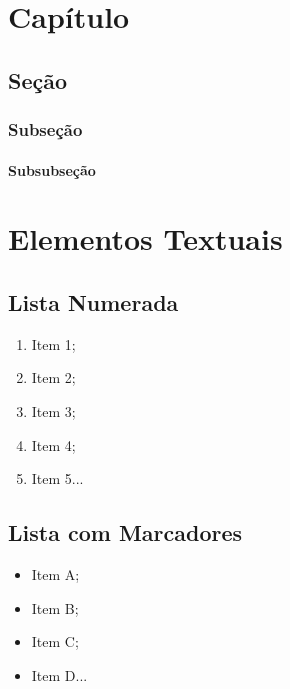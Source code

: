\documentclass[12pt,openright,oneside,a4paper,english,french,spanish,brazil]{unifil}
\begin{document}
\chapter{Capítulo}%


\section{Seção}%


\subsection{Subseção}%


\subsubsection{Subsubseção}%




\chapter{Elementos Textuais}

\section{Lista Numerada}

\begin{enumerate}
 \item Item 1;
 \item Item 2;
 \item Item 3;
 \item Item 4;
 \item Item 5...
\end{enumerate}

\section{Lista com Marcadores}

\begin{itemize}
 \item Item A;
 \item Item B;
 \item Item C;
 \item Item D...
\end{itemize}
\cleardoublepage
\end{document}
